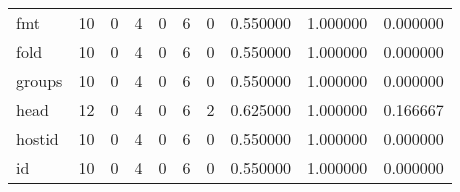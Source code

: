 \begin{longtable}{lrrrrrrrrr}
fmt       &                                       10 &                                                  0 &                                                  4 &                                                  0 &                                                  6 &                                                  0 &                                           0.550000 &                               1.000000 &                             0.000000 \\
fold      &                                       10 &                                                  0 &                                                  4 &                                                  0 &                                                  6 &                                                  0 &                                           0.550000 &                               1.000000 &                             0.000000 \\
groups    &                                       10 &                                                  0 &                                                  4 &                                                  0 &                                                  6 &                                                  0 &                                           0.550000 &                               1.000000 &                             0.000000 \\
head      &                                       12 &                                                  0 &                                                  4 &                                                  0 &                                                  6 &                                                  2 &                                           0.625000 &                               1.000000 &                             0.166667 \\
hostid    &                                       10 &                                                  0 &                                                  4 &                                                  0 &                                                  6 &                                                  0 &                                           0.550000 &                               1.000000 &                             0.000000 \\
id        &                                       10 &                                                  0 &                                                  4 &                                                  0 &                                                  6 &                                                  0 &                                           0.550000 &                               1.000000 &                             0.000000 \\

\end{longtable}
